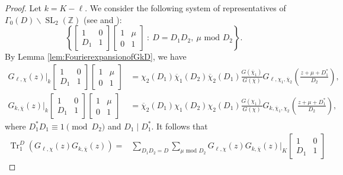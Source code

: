 \documentclass[11pt,letterpaper,reqno]{amsart}
\numberwithin{figure}{section}
\numberwithin{table}{section}
\theoremstyle{definition}
\theoremstyle{plain}
\theoremstyle{definition}
\theoremstyle{definition}
\theoremstyle{remark}
\numberwithin{equation}{section}
\theoremstyle{remark}
\DeclareMathOperator{\Sl}{SL}
\DeclareMathOperator{\Tr}{Tr}
\begin{document}
\begin{proof}
Let $k=K-\ell$. We consider the following system of representatives  of $\Gamma_0(D)\backslash \Sl_{2}(\mathbb{Z})$ (see \cite[p.~276]{GZ-86} and \cite[Lemma 3.1]{kayath2024subspacesspannedeigenformsnonvanishing}):
    \begin{equation*}
        \left\{\begin{bmatrix}
            1 & 0 \\ D_1 & 1
        \end{bmatrix}\begin{bmatrix}
            1 & \mu \\ 0 & 1
        \end{bmatrix}~:~ D=D_1D_2,~\mu \text{ mod }D_2\right\}.
    \end{equation*}
 By Lemma \ref{lem:FourierexpansionofGkD}, we have 
    \begin{align}
    G_{\ell,\chi}(z)\bigg|_{k}\begin{bmatrix}
            1 & 0 \\ D_1 & 1
        \end{bmatrix}\begin{bmatrix}
            1 & \mu \\ 0 & 1
        \end{bmatrix} &=\chi_2(D_1)\overline{\chi}_{1}(D_2)\overline{\chi}_{2}(D_1)\frac{G(\overline{\chi}_{1})}{G(\overline{\chi})}G_{\ell,\chi_1,\overline{\chi}_{2}}\left(\frac{z+\mu+D_1^*}{D_2}\right),   \nonumber\\
       G_{k,\overline{\chi}}(z)\bigg|_{k}\begin{bmatrix}
            1 & 0 \\ D_1 & 1
        \end{bmatrix}\begin{bmatrix}
            1 & \mu \\ 0 & 1
        \end{bmatrix} &=\overline{\chi}_{2}(D_1)\chi_1(D_2)\chi_2(D_1)\frac{G(\chi_{1})}{G(\chi)}G_{k,\overline{\chi}_{1},\chi_2}\left(\frac{z+\mu+D_1^*}{D_2}\right),   \nonumber
    \end{align}
where $D_1^{\ast}D_1\equiv1\pmod {D_2}$ and $D_1\mid D_1^{\ast}$. 
It follows that 
    \begin{align*}\Tr_1^D(G_{\ell,\chi}(z)G_{k,\overline{\chi}}(z)) 
        =&\sum_{D_1D_2=D}\sum_{\mu \text{ mod } D_2} G_{\ell,\chi}(z)G_{k,\overline{\chi}}(z)\bigg|_{K}\begin{bmatrix}
            1 & 0 \\ D_1 & 1

\end{bmatrix}
\end{align*}
\end{proof}
\end{document}
